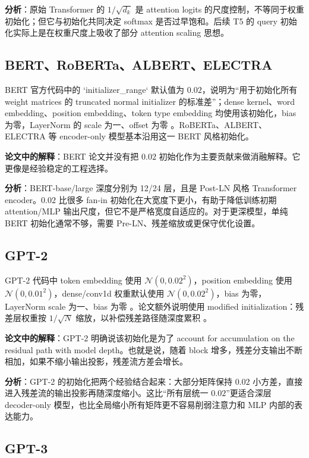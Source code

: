 \documentclass[UTF8,a4paper,11pt]{ctexart}
\newcommand{\Normal}{\mathcal{N}}
\begin{document}
\textbf{分析}：原始 Transformer 的 $1/\sqrt{d_k}$ 是 attention logits 的尺度控制，不等同于权重初始化；但它与初始化共同决定 softmax 是否过早饱和。后续 T5 的 query 初始化实际上是在权重尺度上吸收了部分 attention scaling 思想。

\subsection{BERT、RoBERTa、ALBERT、ELECTRA}

BERT 官方代码中的 `initializer\_range` 默认值为 $0.02$，说明为“用于初始化所有 weight matrices 的 truncated normal initializer 的标准差”；dense kernel、word embedding、position embedding、token type embedding 均使用该初始化，bias 为零，LayerNorm 的 scale 为一、offset 为零 \cite{bertcode}。RoBERTa、ALBERT、ELECTRA 等 encoder-only 模型基本沿用这一 BERT 风格初始化。

\textbf{论文中的解释}：BERT 论文并没有把 $0.02$ 初始化作为主要贡献来做消融解释。它更像是经验稳定的工程选择。

\textbf{分析}：BERT-base/large 深度分别为 12/24 层，且是 Post-LN 风格 Transformer encoder。$0.02$ 比很多 fan-in 初始化在大宽度下更小，有助于降低训练初期 attention/MLP 输出尺度，但它不是严格宽度自适应的。对于更深模型，单纯 BERT 初始化通常不够，需要 Pre-LN、残差缩放或更保守优化设置。

\subsection{GPT-2}

GPT-2 代码中 token embedding 使用 $\Normal(0,0.02^2)$，position embedding 使用 $\Normal(0,0.01^2)$，dense/conv1d 权重默认使用 $\Normal(0,0.02^2)$，bias 为零，LayerNorm scale 为一、bias 为零 \cite{gpt2code}。论文额外说明使用 modified initialization：残差层权重按 $1/\sqrt{N}$ 缩放，以补偿残差路径随深度累积 \cite{gpt2paper}。

\textbf{论文中的解释}：GPT-2 明确说该初始化是为了 account for accumulation on the residual path with model depth。也就是说，随着 block 增多，残差分支输出不断相加，如果不缩小输出投影，残差流方差会增长。

\textbf{分析}：GPT-2 的初始化把两个经验结合起来：大部分矩阵保持 $0.02$ 小方差，直接进入残差流的输出投影再随深度缩小。这比“所有层统一 $0.02$”更适合深层 decoder-only 模型，也比全局缩小所有矩阵更不容易削弱注意力和 MLP 内部的表达能力。

\subsection{GPT-3}
\end{document}
